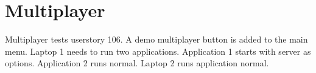 \documentclass{article}
\begin{document}
\section{Multiplayer}
Multiplayer tests userstory 106. A demo multiplayer button is added to the main menu. Laptop 1 needs to run two applications. Application 1 starts with server as options. Application 2 runs normal. Laptop 2 runs application normal.
\end{document}
